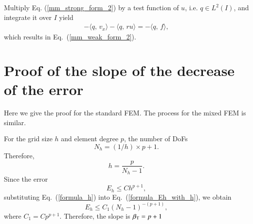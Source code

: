 \documentclass[review,3p]{elsarticle}
\begin{document}
Multiply Eq. (\ref{mm_strong_form_2}) by a test function of $u$, i.e. $q \in L^2 (I)$, and integrate it over $I$ yield
\begin{align}
- \langle q , \, v_x \rangle - \langle q, \, ru \rangle = - \langle q, \, f \rangle, \label{Gene_MM_weak2}
\end{align}
which results in Eq.~(\ref{mm_weak_form_2}).

\section{Proof of the slope of the decrease of the error}				\label{proof_slope_ET}

Here we give the proof for the standard FEM. The process for the mixed FEM is similar. 

For the grid size $h$ and element degree $p$, the number of DoFs
\begin{equation}
N_h=(1/h) \times p+1.			\label{formula_Nh}
\end{equation}
Therefore,
\begin{equation}
h=\frac{p}{N_h-1}.		\label{formula_h}
\end{equation}
Since the error \cite{gockenbach2006understanding}
\begin{equation}
E_h \leqslant Ch^{p+1},			\label{formula_Eh_with_h}
\end{equation}
substituting Eq.~(\ref{formula_h}) into Eq.~(\ref{formula_Eh_with_h}), we obtain
\begin{equation}
E_h \leqslant C_1(N_h-1)^{-(p+1)},			\label{formula_Eh_with_Nh}
\end{equation}
where $C_1=C p^{p+1}$. Therefore, the slope is $\beta_{\rm T}=p+1$

  

\end{document}
